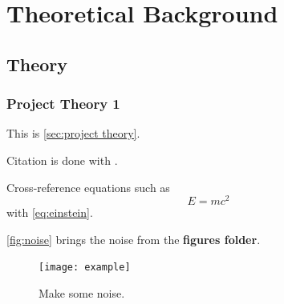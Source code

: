 \chapter{Theoretical Background}

\section{Theory}\label{sec:Theory}

\subsection{Project Theory 1}\label{sec:project theory}
This is \autoref{sec:project theory}.

Citation is done with  \cite[p.~100]{Sakurai}.

Cross-reference equations such as
\begin{equation}\label{eq:einstein}
    E = m c^2
\end{equation}
with \cref{eq:einstein}.

\autoref{fig:noise} brings the noise from the \textbf{figures folder}. 
\begin{figure}[H]
\begin{center}\texttt{[image: example]} 
\end{center}
\caption{Make some noise.}
\label{fig:noise}
\end{figure}

